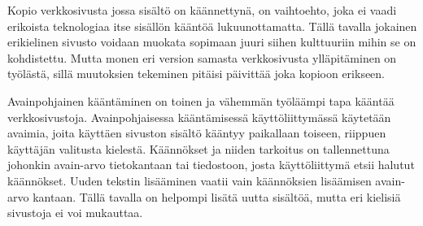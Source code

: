 \documentclass[11pt,a4paper,titlepage,oneside]{article}
\begin{document}
%








Kopio verkkosivusta jossa sisältö on käännettynä, on vaihtoehto, joka ei vaadi erikoista teknologiaa itse sisällön kääntöä lukuunottamatta.
Tällä tavalla jokainen erikielinen sivusto voidaan muokata sopimaan juuri siihen kulttuuriin mihin se on kohdistettu.
Mutta monen eri version samasta verkkosivusta ylläpitäminen on työlästä, sillä muutoksien tekeminen pitäisi päivittää joka kopioon erikseen.
\medskip







Avainpohjainen kääntäminen on toinen ja vähemmän työläämpi tapa kääntää verkkosivustoja.
Avainpohjaisessa kääntämisessä käyttöliittymässä käytetään avaimia, joita käyttäen sivuston sisältö kääntyy paikallaan toiseen, 
riippuen käyttäjän valitusta kielestä.
%
Käännökset ja niiden tarkoitus on tallennettuna johonkin avain-arvo tietokantaan tai tiedostoon,
josta käyttöliittymä etsii halutut käännökset.
Uuden tekstin lisääminen vaatii vain käännöksien lisäämisen avain-arvo kantaan.
Tällä tavalla on helpompi lisätä uutta sisältöä, mutta eri kielisiä sivustoja ei voi mukauttaa.
\medskip
\end{document}

